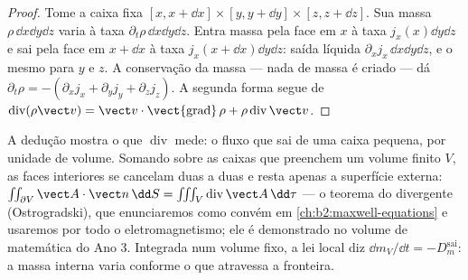 \begin{proof}
Tome a caixa fixa $[x, x + \dd x]\times[y, y + \dd y]\times[z, z + \dd z]$.
Sua massa $\rho\,\dd x\dd y\dd z$ varia à taxa $\partial_t\rho\,\dd x\dd y
\dd z$. Entra massa pela face em $x$ à taxa $j_x(x)\dd y\dd z$
e sai pela face em $x + \dd x$ à taxa $j_x(x + \dd x)\dd y\dd z$:
saída líquida $\partial_xj_x\,\dd x\dd y\dd z$, e o mesmo para $y$ e $z$.
A conservação da massa --- nada de massa é criado --- dá $\partial_t\rho = -
(\partial_xj_x + \partial_yj_y + \partial_zj_z)$. A segunda forma segue de
$\operatorname{div}(\rho\vect v) = \vect v\cdot\operatorname{\vect{grad}}\rho +
\rho\operatorname{div}\vect v$.
\end{proof}

\begin{remark}\label{rem:b2:fluid-kinematics:divergence}
A dedução mostra o que $\operatorname{div}$ mede: o fluxo que sai de
uma caixa pequena, por unidade de volume. Somando sobre as caixas que preenchem um volume
finito $V$, as faces interiores se cancelam duas a duas e resta apenas a
superfície externa: $\iint_{\partial V}\vect A\cdot\vect n\,\dd S = \iiint_V
\operatorname{div}\vect A\,\dd\tau$ --- o teorema do divergente (Ostrogradski),
que enunciaremos como convém em \cref{ch:b2:maxwell-equations}
e usaremos por todo o eletromagnetismo; ele é demonstrado no volume de
matemática do Ano 3. Integrada num volume fixo, a lei local diz
$\dd m_V/\dd t = -D_m^{\text{sai}}$: a massa interna varia conforme o que
atravessa a fronteira.
\end{remark}

